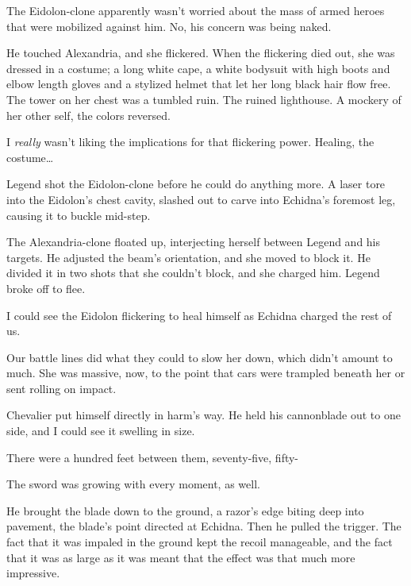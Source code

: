 





The Eidolon-clone apparently wasn't worried about the mass of armed heroes that were mobilized against him.  No, his concern was being naked.



He touched Alexandria, and she flickered.  When the flickering died out, she was dressed in a costume; a long white cape, a white bodysuit with high boots and elbow length gloves and a stylized helmet that let her long black hair flow free.  The tower on her chest was a tumbled ruin.  The ruined lighthouse.  A mockery of her other self, the colors reversed.



I \emph{really} wasn't liking the implications for that flickering power.  Healing, the costume\ldots



Legend shot the Eidolon-clone before he could do anything more.  A laser tore into the Eidolon's chest cavity, slashed out to carve into Echidna's foremost leg, causing it to buckle mid-step.



The Alexandria-clone floated up, interjecting herself between Legend and his targets.  He adjusted the beam's orientation, and she moved to block it.  He divided it in two shots that she couldn't block, and she charged him.  Legend broke off to flee.



I could see the Eidolon flickering to heal himself as Echidna charged the rest of us.



Our battle lines did what they could to slow her down, which didn't amount to much.  She was massive, now, to the point that cars were trampled beneath her or sent rolling on impact.



Chevalier put himself directly in harm's way.  He held his cannonblade out to one side, and I could see it swelling in size.



There were a hundred feet between them, seventy-five, fifty-



The sword was growing with every moment, as well.



He brought the blade down to the ground, a razor's edge biting deep into pavement, the blade's point directed at Echidna.  Then he pulled the trigger.  The fact that it was impaled in the ground kept the recoil manageable, and the fact that it was as large as it was meant that the effect was that much more impressive.



